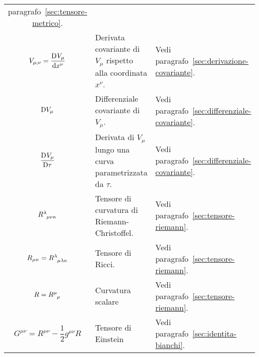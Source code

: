 \begin{longtable}{c
    p{}
    p{}}
  paragrafo~\ref{sec:tensore-metrico}. \\
  $V_{\mu;\nu} = \displaystyle\frac{{\mathop{}\!\mathrm{D}^{}}V_{\mu}}{\mathop{}\!\mathrm{d} {x^{\nu}}^{}}$ & Derivata covariante
  di $V_{\mu}$ rispetto alla coordinata $x^{\nu}$. & Vedi
  paragrafo~\ref{sec:derivazione-covariante}. \\
  $\mathop{}\!\mathrm{D} V_{\mu}$ & Differenziale covariante di $V_{\mu}$. & Vedi
  paragrafo~\ref{sec:differenziale-covariante}. \\[1.6ex]
  $\displaystyle\frac{{\mathop{}\!\mathrm{D}^{}}V_{\mu}}{\mathop{}\!\mathrm{D} \tau^{}}$ & Derivata di $V_{\mu}$ lungo una curva
  parametrizzata da $\tau$. & Vedi
  paragrafo~\ref{sec:differenziale-covariante}. \\
  $\tensor{R}{^{\lambda}_{\mu\nu\kappa}}$ & Tensore di curvatura di
  Riemann-Christoffel. & Vedi paragrafo~\ref{sec:tensore-riemann}. \\
  $R_{\mu\kappa} = \tensor{R}{^{\lambda}_{\mu\lambda\kappa}}$ & Tensore di
  Ricci. & Vedi paragrafo~\ref{sec:tensore-riemann}. \\[1.6ex]
  $R = \tensor{R}{^{\mu}_{\mu}}$ & Curvatura scalare & Vedi
  paragrafo~\ref{sec:tensore-riemann}. \\[1.6ex]
  $G^{\mu\nu} = R^{\mu\nu} - \dfrac{1}{2} g^{\mu\nu}R$ & Tensore di Einstein &
  Vedi paragrafo~\ref{sec:identita-bianchi}. \\
\end{longtable}


